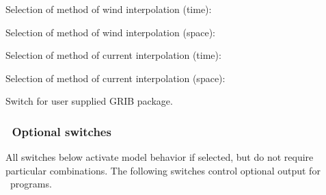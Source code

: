 \noindent
Selection of method of wind interpolation (time):
\begin{slist}
\end{slist}

\noindent
Selection of method of wind interpolation (space):
\begin{slist}
\end{slist}

\noindent
Selection of method of current interpolation (time):
\begin{slist}
\end{slist}

\noindent
Selection of method of current interpolation (space):
\begin{slist}
\end{slist}

\noindent
Switch for user supplied GRIB package.
\begin{slist}
\end{slist}

\vsssub
\subsubsection{~Optional switches} \label{sub:opt_switch}
\vsssub

All switches below activate model behavior if selected, but do not require
particular combinations. The following switches control optional output for
\ws\ programs.

